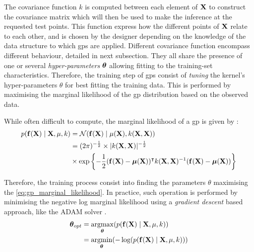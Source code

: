 The covariance function $k$ is computed between each element of $\boldsymbol{\mathbf{X}}$ to construct the covariance matrix which will then be used to make the inference at the requested test points. This function express how the different points of $\boldsymbol{\mathbf{X}}$ relate to each other, and is chosen by the designer depending on the knowledge of the data structure to which \gls{gps} are applied. Different covariance function encompass different behaviour, detailed in next subsection. They all share the presence of one or several \emph{hyper-parameters} $\boldsymbol{\mathbf{\theta}}$ allowing fitting to the training-set characteristics. Therefore, the training step of \gls{gps} consist of \emph{tuning} the kernel's hyper-parameters $\theta$ for best fitting the training data. This is performed by maximising the marginal likelihood of the \gls{gp} distribution based on the observed data.

While often difficult to compute, the marginal likelihood of a \gls{gp} is given by \cite{duvenaud_automatic_2014}:
\begin{equation} \label{eq:gp_marginal_likelihood}
\begin{aligned}
p(\boldsymbol{\mathbf{f}}(\boldsymbol{\mathbf{X}}) \mid \boldsymbol{\mathbf{X}}, \mu, k) &=\mathcal{N}(\boldsymbol{\mathbf{f}}(\boldsymbol{\mathbf{X}}) \mid \mu(\boldsymbol{\mathbf{X}}), k(\boldsymbol{\mathbf{X}}, \boldsymbol{\mathbf{X}})) \\
&=(2 \pi)^{-\frac{1}{2}} \times |k(\boldsymbol{\mathbf{X}}, \boldsymbol{\mathbf{X}})|^{-\frac{1}{2}} \\
&\times \exp \left\{-\frac{1}{2}(\boldsymbol{\mathbf{f}}(\boldsymbol{\mathbf{X}})-\boldsymbol{\mathbf{\mu}}(\boldsymbol{\mathbf{X}}))^{\intercal} k(\boldsymbol{\mathbf{X}}, \boldsymbol{\mathbf{X}})^{-1}(\boldsymbol{\mathbf{f}}(\boldsymbol{\mathbf{X}})-\boldsymbol{\mathbf{\mu}}(\boldsymbol{\mathbf{X}}))\right\}
\end{aligned}
\end{equation}

Therefore, the training process consist into finding the parameters $\theta$ maximising the \cref{eq:gp_marginal_likelihood}. In practice, such operation is performed by minimising the negative log marginal likelihood using a \emph{gradient descent} based approach, like the ADAM solver \cite{murphy_machine_2012}.
\begin{equation}
\begin{aligned}
\boldsymbol{\mathbf{\theta}}_{opt} &=\underset{\boldsymbol{\mathbf{\theta}}}{\operatorname{argmax}}(p(\boldsymbol{\mathbf{f}}(\boldsymbol{\mathbf{X}}) \mid \boldsymbol{\mathbf{X}}, \mu, k)) \\
&= \underset{\boldsymbol{\mathbf{\theta}}}{\operatorname{argmin}}(-\log(p(\boldsymbol{\mathbf{f}}(\boldsymbol{\mathbf{X}}) \mid \boldsymbol{\mathbf{X}}, \mu, k)))
\end{aligned}
\end{equation}

